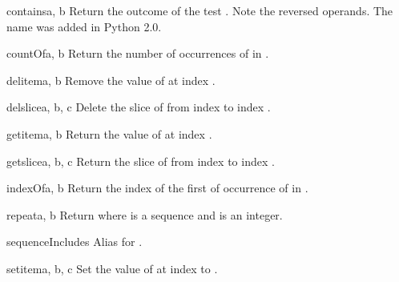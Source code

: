 \begin{funcdesc}{contains}{a, b}
Return the outcome of the test   .
Note the reversed operands.  The name  was
added in Python 2.0.
\end{funcdesc}

\begin{funcdesc}{countOf}{a, b}
Return the number of occurrences of  in .
\end{funcdesc}

\begin{funcdesc}{delitem}{a, b}
Remove the value of  at index .
\end{funcdesc}

\begin{funcdesc}{delslice}{a, b, c}
Delete the slice of  from index  to index .
\end{funcdesc}

\begin{funcdesc}{getitem}{a, b}
Return the value of  at index .
\end{funcdesc}

\begin{funcdesc}{getslice}{a, b, c}
Return the slice of  from index  to index .
\end{funcdesc}

\begin{funcdesc}{indexOf}{a, b}
Return the index of the first of occurrence of  in .
\end{funcdesc}

\begin{funcdesc}{repeat}{a, b}
Return  \code{*}  where  is a sequence and
 is an integer.
\end{funcdesc}

\begin{funcdesc}{sequenceIncludes}{\unspecified}
Alias for .
\end{funcdesc}

\begin{funcdesc}{setitem}{a, b, c}
Set the value of  at index  to .
\end{funcdesc}

